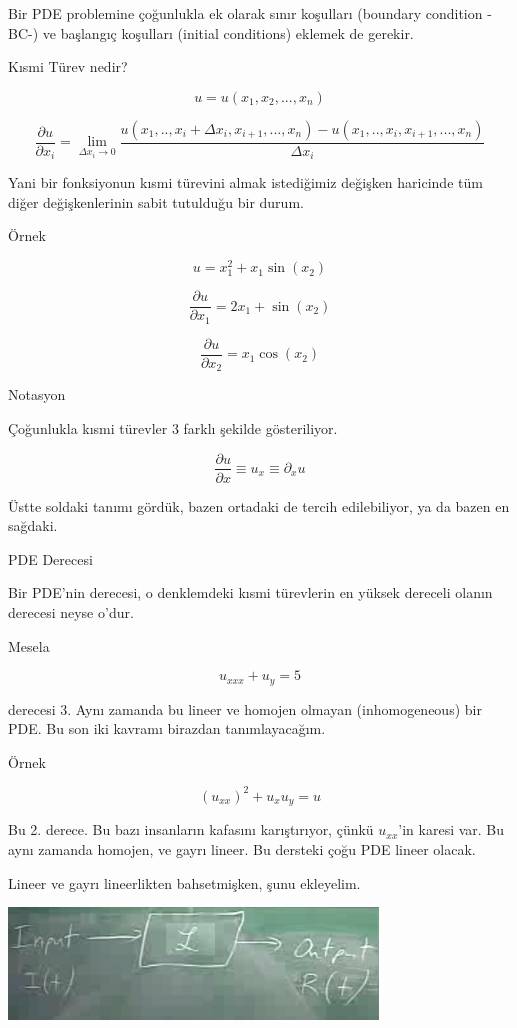 \documentclass[12pt,fleqn]{article}\usepackage{../../common}
\begin{document}
Bir PDE problemine çoğunlukla ek olarak sınır koşulları (boundary condition
-BC-) ve başlangıç koşulları (initial conditions) eklemek de gerekir.

Kısmi Türev nedir? 

$$ u = u(x_1, x_2,...,x_n) $$

$$ 
\frac{\partial u}{\partial x_i} = 
\lim_{\Delta x_i \to 0} 
\frac{
u(x_1,..,x_i+\Delta x_i,x_{i+1},...,x_n) - u(x_1,..,x_i,x_{i+1},...,x_n)}
{\Delta x_i}  $$

Yani bir fonksiyonun kısmi türevini almak istediğimiz değişken haricinde
tüm diğer değişkenlerinin sabit tutulduğu bir durum. 

Örnek

$$ u = x_1^2 + x_1\sin(x_2) $$

$$ 
\frac{\partial u}{\partial x_1} = 2x_1 + \sin(x_2)
 $$

$$ 
\frac{\partial u}{\partial x_2} = x_1 \cos(x_2)
 $$

Notasyon

Çoğunlukla kısmi türevler 3 farklı şekilde gösteriliyor. 

$$ \frac{\partial u}{\partial x} \equiv u_x \equiv \partial_x u $$

Üstte soldaki tanımı gördük, bazen ortadaki de tercih edilebiliyor, ya da
bazen en sağdaki. 

PDE Derecesi

Bir PDE'nin derecesi, o denklemdeki kısmi türevlerin en yüksek dereceli
olanın derecesi neyse o'dur.

Mesela

$$ u_{xxx} + u_y = 5 $$

derecesi 3. Aynı zamanda bu lineer ve homojen olmayan (inhomogeneous) bir
PDE. Bu son iki kavramı birazdan tanımlayacağım. 

Örnek 

$$ (u_{xx})^2 + u_xu_y = u $$

Bu 2. derece. Bu bazı insanların kafasını karıştırıyor, çünkü $u_{xx}$'in
karesi var. Bu aynı zamanda homojen, ve gayrı lineer. Bu dersteki çoğu PDE
lineer olacak. 

Lineer ve gayrı lineerlikten bahsetmişken, şunu ekleyelim. 

\includegraphics[height=3cm]{1_5.png}
\end{document}

